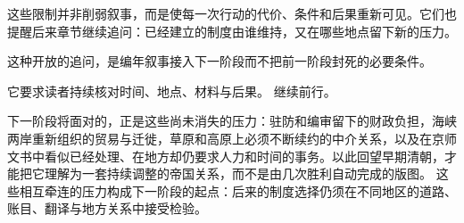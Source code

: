 这些限制并非削弱叙事，而是使每一次行动的代价、条件和后果重新可见。它们也提醒后来章节继续追问：已经建立的制度由谁维持，又在哪些地点留下新的压力。


这种开放的追问，是编年叙事接入下一阶段而不把前一阶段封死的必要条件。

它要求读者持续核对时间、地点、材料与后果。
继续前行。


下一阶段将面对的，正是这些尚未消失的压力：驻防和编审留下的财政负担，海峡两岸重新组织的贸易与迁徙，草原和高原上必须不断续约的中介关系，以及在京师文书中看似已经处理、在地方却仍要求人力和时间的事务。以此回望早期清朝，才能把它理解为一套持续调整的帝国关系，而不是由几次胜利自动完成的版图。
这些相互牵连的压力构成下一阶段的起点：后来的制度选择仍须在不同地区的道路、账目、翻译与地方关系中接受检验。
